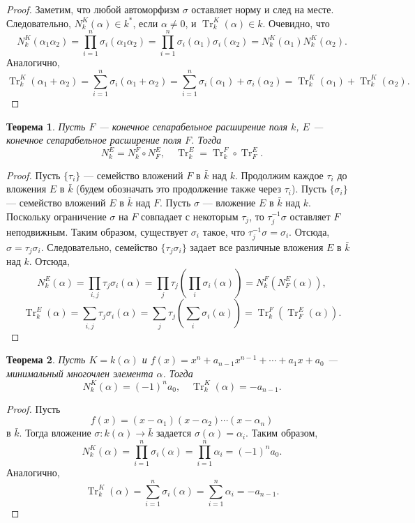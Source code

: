 \documentclass[12pt, titlepage, oneside]{amsbook}
\newcommand{\Tr}{\operatorname{Tr}}
\newtheorem{theorem}{Теорема}[chapter]
\theoremstyle{definition}
\theoremstyle{remark}
\begin{document}
\begin{proof}
Заметим, что любой автоморфизм $\sigma$ оставляет норму и след на месте. Следовательно, $N_k^K(\alpha)\in k^*$, если $\alpha\neq 0$, и $\Tr_k^K(\alpha)\in k$. Очевидно, что $$N_k^K(\alpha_1\alpha_2)=\prod\limits_{i=1}^n \sigma_i(\alpha_1\alpha_2)=\prod\limits_{i=1}^n \sigma_i(\alpha_1)\sigma_i(\alpha_2)=N_k^K(\alpha_1)N_k^K(\alpha_2).$$ Аналогично, $$\Tr_k^K(\alpha_1+\alpha_2)=\sum\limits_{i=1}^n \sigma_i(\alpha_1+\alpha_2)=\sum\limits_{i=1}^n \sigma_i(\alpha_1)+\sigma_i(\alpha_2)=\Tr_k^K(\alpha_1)+\Tr_k^K(\alpha_2).$$
\end{proof}

\begin{theorem}
\label{Norm2}
Пусть $F$ --- конечное сепарабельное расширение поля $k$, $E$ --- конечное сепарабельное расширение поля $F$. Тогда $$N_k^E=N_k^F\circ N_F^E,\quad\Tr_k^E=\Tr_k^F\circ\Tr_F^E.$$
\end{theorem}

\begin{proof}
Пусть $\{\tau_i\}$ --- семейство вложений $F$  в $\bar{k}$ над $k$. Продолжим каждое $\tau_i$ до вложения $E$ в $\bar{k}$ (будем обозначать это продолжение также через $\tau_i$). Пусть $\{\sigma_i\}$ --- семейство вложений $E$  в $\bar{k}$ над $F$. Пусть $\sigma$ --- вложение $E$ в $\bar{k}$ над $k$. Поскольку ограничение $\sigma$ на $F$ совпадает с некоторым $\tau_j$, то $\tau_j^{-1}\sigma$ оставляет $F$ неподвижным. Таким образом, существует $\sigma_i$ такое, что $\tau_j^{-1}\sigma=\sigma_i$. Отсюда, $\sigma=\tau_j\sigma_i$. Следовательно, семейство $\{\tau_j\sigma_i\}$ задает все различные вложения $E$ в $\bar{k}$ над $k$. Отсюда, $$N_k^E(\alpha)=\prod\limits_{i,j} \tau_j\sigma_i(\alpha)=\prod\limits_{j} \tau_j\left(\prod\limits_{i}\sigma_i(\alpha)\right)=N_k^F(N_F^E(\alpha)),$$
$$\Tr_k^E(\alpha)=\sum\limits_{i,j} \tau_j\sigma_i(\alpha)=\sum\limits_{j} \tau_j\left(\sum\limits_{i}\sigma_i(\alpha)\right)=\Tr_k^F(\Tr_F^E(\alpha)).$$
\end{proof}

\begin{theorem}
\label{Norm3}
Пусть $K=k(\alpha)$ и $f(x)=x^n+a_{n-1}x^{n-1}+\cdots+a_1 x+a_0$ --- минимальный многочлен элемента $\alpha$. Тогда $$N_k^K(\alpha)=(-1)^n a_0,\quad \Tr_k^K(\alpha)=-a_{n-1}.$$
\end{theorem}

\begin{proof}
Пусть $$f(x)=(x-\alpha_1)(x-\alpha_2)\cdots(x-\alpha_n)$$ в $\bar{k}$. Тогда вложение $\sigma\colon k(\alpha)\rightarrow\bar{k}$ задается $\sigma(\alpha)=\alpha_i$. Таким образом, $$N_k^K(\alpha)=\prod\limits_{i=1}^n \sigma_i(\alpha)=\prod\limits_{i=1}^n\alpha_i=(-1)^n a_0.$$ Аналогично, $$\Tr_k^K(\alpha)=\sum\limits_{i=1}^n \sigma_i(\alpha)=\sum\limits_{i=1}^n\alpha_i=-a_{n-1}.$$
\end{proof}
\end{document}
